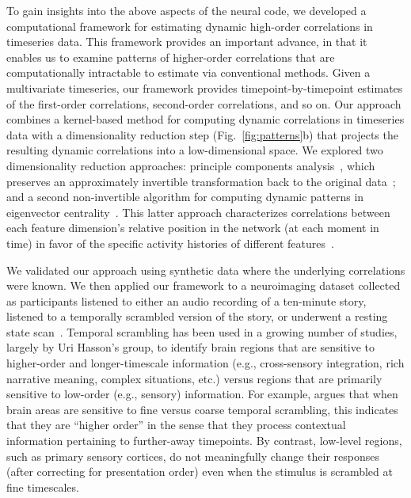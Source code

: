 \documentclass[english]{article}
\begin{document}
To gain insights into the above aspects of the neural code, we
developed a computational framework for estimating dynamic high-order
correlations in timeseries data. This framework provides an important
advance, in that it enables us to examine patterns of higher-order
correlations that are computationally intractable to estimate via
conventional methods.  Given a multivariate timeseries, our framework
provides timepoint-by-timepoint estimates of the first-order
correlations, second-order correlations, and so on.  Our approach
combines a kernel-based method for computing dynamic correlations in
timeseries data with a dimensionality reduction step
(Fig.~\ref{fig:patterns}b) that projects the resulting dynamic
correlations into a low-dimensional space.  We explored two
dimensionality reduction approaches: principle components
analysis~\citep[PCA;][]{Pear01}, which preserves an approximately
invertible transformation back to the original data~\citep[e.g., this
follows related approaches taken by][]{McInJirs19, TokeSomm19,
  GonzEtal19}; and a second non-invertible algorithm for computing
dynamic patterns in eigenvector centrality~\citep{Land95}.  This
latter approach characterizes correlations between each feature
dimension's relative position in the network (at each moment
in time) in favor of the specific activity histories of different
features~\citep[also see][]{BetzEtal19, SizeEtal18, ReimEtal17}.

We validated our approach using synthetic data where the underlying
correlations were known.  We then applied our framework to a
neuroimaging dataset collected as participants listened to either an
audio recording of a ten-minute story, listened to a temporally
scrambled version of the story, or underwent a resting state
scan~\citep{SimoEtal16}.  Temporal scrambling has been used in a
growing number of studies, largely by Uri Hasson's group, to identify
brain regions that are sensitive to higher-order and longer-timescale
information (e.g., cross-sensory integration, rich narrative meaning,
complex situations, etc.) versus regions that are primarily sensitive
to low-order (e.g., sensory) information.  For example,
\cite{HassEtal08} argues that when brain areas are sensitive to fine
versus coarse temporal scrambling, this indicates that they are
``higher order'' in the sense that they process contextual information
pertaining to further-away timepoints.  By contrast, low-level
regions, such as primary sensory cortices, do not meaningfully change
their responses (after correcting for presentation order) even when
the stimulus is scrambled at fine timescales.
\end{document}
